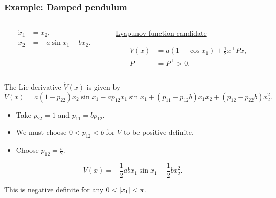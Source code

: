 \begin{frame}
    \frametitle{Example: Damped pendulum}

    \begin{columns}
        \begin{column}{0.5\textwidth}
            \begin{align*}
                \dot{x}_1 &= x_2, \\
                \dot{x}_2 &= -a \sin{x_1} - bx_2.
            \end{align*}
        \end{column}
        \begin{column}{0.5\textwidth}
            \begin{center}
                \underline{Lyapunov function candidate}
            \end{center}
            \vspace{-5mm}
            \begin{align*}
                V(x) &= a(1 - \cos{x_1}) + \frac{1}{2}x^\top P x, \\
                P &= P^\top > 0.
            \end{align*}
        \end{column}
    \end{columns}
    The Lie derivative $\dot{V}(x)$ is given by 
    \begin{equation*}
        \dot{V}(x) = a(1-p_{22})x_2 \sin{x_1} - ap_{12}x_1 \sin{x_1} + (p_{11} - p_{12}b)x_1x_2 + (p_{12}-p_{22}b)x_2^2.
    \end{equation*}

    \begin{itemize}
        \item Take $p_{22} = 1$ and $p_{11} = bp_{12}$.
        \item We must choose $0 < p_{12} < b$ for $V$ to be positive definite. 
        \item Choose $p_{12} = \frac{b}{2}$.
    \end{itemize}

     \begin{equation*}
        \dot{V}(x) = -\frac{1}{2}a b x_1 \sin{x_1} - \frac{1}{2}bx_2^2.
     \end{equation*}

     This is negative definite for any $0 < \left|{x_1}\right| < \pi$.
\end{frame}


